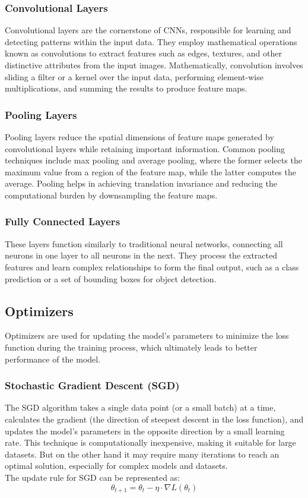 \documentclass{article}
\begin{document}
\subsubsection{Convolutional Layers}
Convolutional layers are the cornerstone of CNNs, responsible for learning and detecting patterns within the input data. They employ mathematical operations known as convolutions to extract features such as edges, textures, and other distinctive attributes from the input images. Mathematically, convolution involves sliding a filter or a kernel over the input data, performing element-wise multiplications, and summing the results to produce feature maps.

\subsubsection{Pooling Layers}
Pooling layers reduce the spatial dimensions of feature maps generated by convolutional layers while retaining important information. Common pooling techniques include max pooling and average pooling, where the former selects the maximum value from a region of the feature map, while the latter computes the average. Pooling helps in achieving translation invariance and reducing the computational burden by downsampling the feature maps.

\subsubsection{Fully Connected Layers}
These layers function similarly to traditional neural networks, connecting all neurons in one layer to all neurons in the next. They process the extracted features and learn complex relationships to form the final output, such as a class prediction or a set of bounding boxes for object detection.

\subsection{Optimizers}
Optimizers are used for updating the model's parameters to minimize the loss function during the training process, which ultimately leads to better performance of the model.

\subsubsection{Stochastic Gradient Descent (SGD)}
The SGD algorithm takes a single data point (or a small batch) at a time, calculates the gradient (the direction of steepest descent in the loss function), and updates the model's parameters in the opposite direction by a small learning rate. This technique is computationally inexpensive, making it suitable for large datasets. But on the other hand it may require many iterations to reach an optimal solution, especially for complex models and datasets.\\
The update rule for SGD can be represented as:
$${\theta_{t+1} = \theta_t - \eta \cdot \nabla L(\theta_t)}$$
\end{document}
